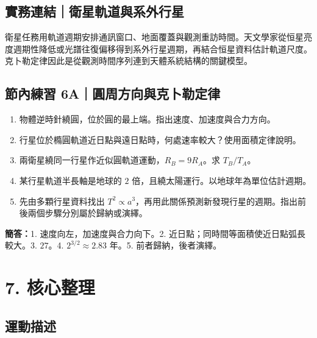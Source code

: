 \documentclass[11pt,a4paper]{article}
\providecommand{\tightlist}{%
  \setlength{\itemsep}{0pt}\setlength{\parskip}{0pt}}
\begin{document}
\subsection{實務連結｜衛星軌道與系外行星}\label{ux5be6ux52d9ux9023ux7d50ux885bux661fux8eccux9053ux8207ux7cfbux5916ux884cux661f}

衛星任務用軌道週期安排通訊窗口、地面覆蓋與觀測重訪時間。天文學家從恒星亮度週期性降低或光譜往復偏移得到系外行星週期，再結合恒星資料估計軌道尺度。克卜勒定律因此是從觀測時間序列連到天體系統結構的關鍵模型。

\begin{HandoutSelfCheck}

\subsection{節內練習 6A｜圓周方向與克卜勒定律}\label{ux7bc0ux5167ux7df4ux7fd2-6aux5713ux5468ux65b9ux5411ux8207ux514bux535cux52d2ux5b9aux5f8b}

\begin{enumerate}
\def\labelenumi{\arabic{enumi}.}
\tightlist
\item
  物體逆時針繞圓，位於圓的最上端。指出速度、加速度與合力方向。
\item
  行星位於橢圓軌道近日點與遠日點時，何處速率較大？使用面積定律說明。
\item
  兩衛星繞同一行星作近似圓軌道運動，\(R_B=9R_A\)。求 \(T_B/T_A\)。
\item
  某行星軌道半長軸是地球的 \(2\) 倍，且繞太陽運行。以地球年為單位估計週期。
\item
  先由多顆行星資料找出 \(T^2\propto a^3\)，再用此關係預測新發現行星的週期。指出前後兩個步驟分別屬於歸納或演繹。
\end{enumerate}

\textbf{簡答：}1. 速度向左，加速度與合力向下。2. 近日點；同時間等面積使近日點弧長較大。3. \(27\)。4. \(2^{3/2}\approx2.83\) 年。5. 前者歸納，後者演繹。

\end{HandoutSelfCheck}

\section{7. 核心整理}\label{ux6838ux5fc3ux6574ux7406}

\subsection{運動描述}\label{ux904bux52d5ux63cfux8ff0}
\end{document}

